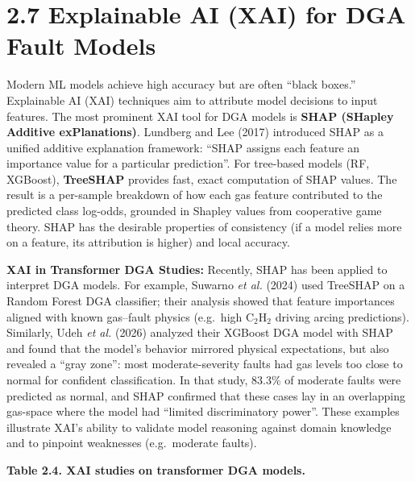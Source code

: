 \section{2.7 Explainable AI (XAI) for DGA Fault
Models}\label{explainable-ai-xai-for-dga-fault-models}

Modern ML models achieve high accuracy but are often ``black boxes.''
Explainable AI (XAI) techniques aim to attribute model decisions to
input features. The most prominent XAI tool for DGA models is
\textbf{SHAP (SHapley Additive exPlanations)}. Lundberg and Lee (2017)
introduced SHAP as a unified additive explanation framework: ``SHAP
assigns each feature an importance value for a particular prediction''.
For tree-based models (RF, XGBoost), \textbf{TreeSHAP} provides fast,
exact computation of SHAP values. The result is a per-sample breakdown
of how each gas feature contributed to the predicted class log-odds,
grounded in Shapley values from cooperative game theory. SHAP has the
desirable properties of consistency (if a model relies more on a
feature, its attribution is higher) and local accuracy.

\textbf{XAI in Transformer DGA Studies:} Recently, SHAP has been applied
to interpret DGA models. For example, Suwarno \emph{et al.} (2024) used
TreeSHAP on a Random Forest DGA classifier; their analysis showed that
feature importances aligned with known gas--fault physics (e.g.~high
C$_2$H$_2$ driving arcing predictions). Similarly, Udeh \emph{et al.} (2026)
analyzed their XGBoost DGA model with SHAP and found that the model's
behavior mirrored physical expectations, but also revealed a ``gray
zone'': most moderate-severity faults had gas levels too close to normal
for confident classification. In that study, 83.3\% of moderate faults
were predicted as normal, and SHAP confirmed that these cases lay in an
overlapping gas-space where the model had ``limited discriminatory
power''. These examples illustrate XAI's ability to validate model
reasoning against domain knowledge and to pinpoint weaknesses
(e.g.~moderate faults).

\textbf{Table 2.4. XAI studies on transformer DGA models.}

